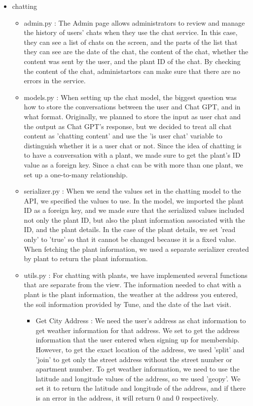 \documentclass[conference, a4paper]{IEEEtran}
\begin{document}
\begin{enumerate}
\begin{itemize}
    \item chatting
    \begin{itemize}
        \item admin.py : The Admin page allows administrators to review and manage the history of users' chats when they use the chat service. In this case, they can see a list of chats on the screen, and the parts of the list that they can see are the date of the chat, the content of the chat, whether the content was sent by the user, and the plant ID of the chat. By checking the content of the chat, administartors can make sure that there are no errors in the service. \\
        \item models.py : When setting up the chat model, the biggest question was how to store the conversations between the user and Chat GPT, and in what format. Originally, we planned to store the input as user chat and the output as Chat GPT's response, but we decided to treat all chat content as 'chatting content' and use the 'is user chat' variable to distinguish whether it is a user chat or not. Since the idea of chatting is to have a conversation with a plant, we made sure to get the plant's ID value as a foreign key. Since a chat can be with more than one plant, we set up a one-to-many relationship. \\
        \item serializer.py : When we send the values set in the chatting model to the API, we specified the values to use. In the model, we imported the plant ID as a foreign key, and we made sure that the serialized values included not only the plant ID, but also the plant information associated with the ID, and the plant details. In the case of the plant details, we set 'read only' to 'true' so that it cannot be changed because it is a fixed value. When fetching the plant information, we used a separate serializer created by plant to return the plant information. \\
        \item utils.py : For chatting with plants, we have implemented several functions that are separate from the view. The information needed to chat with a plant is the plant information, the weather at the address you entered, the soil information provided by Tune, and the date of the last visit. \\
        \begin{itemize}
            \item Get City Address : We need the user's address as chat information to get weather information for that address. We set to get the address information that the user entered when signing up for membership. However, to get the exact location of the address, we used 'split' and 'join' to get only the street address without the street number or apartment number. To get weather information, we need to use the latitude and longitude values of the address, so we used 'geopy'. We set it to return the latitude and longitude of the address, and if there is an error in the address, it will return 0 and 0 respectively. \\

\end{itemize}
\end{itemize}
\end{itemize}
\end{enumerate}
\end{document}
